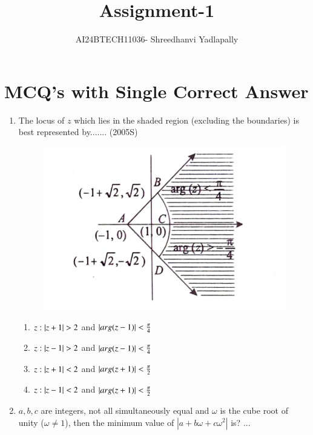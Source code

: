 \documentclass[journal,12pt,twocolumn]{IEEEtran}
\theoremstyle{remark}
\begin{document}

\vspace{3cm}

\title{Assignment-1}
\author{AI24BTECH11036- Shreedhanvi Yadlapally}
\maketitle
\newpage
\bigskip
\section{MCQ's with Single Correct Answer}
\begin{enumerate}
	\item The locus of $z$ which lies in the shaded region (excluding the boundaries) is best represented by.......
		\hfill{(2005S)}\\
			\begin{figure}[ht]
\includegraphics[scale=0.2]{Screenshot_20240807-085214}
		\end{figure}
\begin{enumerate}[label=(\alph*)]
\item $z:\left\vert z+1\right\vert>2$ and  $\left\vert arg(z-1)\right\vert<\frac{\pi}{4}$
\item $z:\left\vert z-1\right\vert>2$ and $\left\vert arg(z-1)\right\vert<\frac{\pi}{4}$
\item $z:\left\vert z+1\right\vert<2$ and $\left\vert arg(z+1)\right\vert<\frac{\pi}{2}$
\item $z:\left\vert z-1\right\vert<2$ and $\left\vert arg(z+1)\right\vert<\frac{\pi}{2}$
\end{enumerate}
\item $a,b,c$ are integers, not all simultaneously equal and $\omega$ is the cube root of unity ($\omega \neq 1$), then the minimum value of $|a+b\omega+c\omega^{2}|$ is?                                                  ...\\


\end{enumerate}
\end{document}
